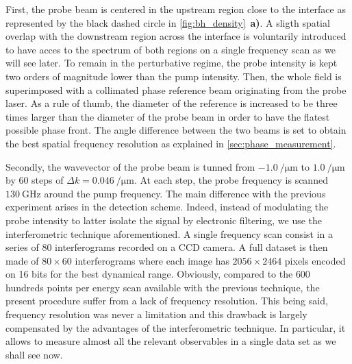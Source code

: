 First, the probe beam is centered in the upstream region close to the interface as represented by the black dashed circle in \autoref{fig:bh_density}~\textbf{a)}.
A sligth spatial overlap with the downstream region across the interface is voluntarily introduced to have acces to the spectrum of both regions on a single frequency scan as we will see later. To remain in 
the perturbative regime, the probe intensity is kept two orders of magnitude lower than the pump intensity.
Then, the whole field is superimposed with a collimated phase reference beam originating from the probe laser. As a rule of thumb, the diameter of the reference is 
increased to be three times larger than the diameter of the probe beam in order to have the flatest possible phase front.
 The angle difference between the two beams is set to obtain the best spatial frequency resolution as explained in \autoref{sec:phase_measurement}.


Secondly, the wavevector of the probe beam is tunned from $\SI{-1.0}{\per \micro \meter}$ to $\SI{1.0}{\per \micro \meter}$ by 60 steps of $\Delta k =\SI{0.046}{\per \micro \meter}$.
At each step, the probe frequency is scanned $\SI{130}{\giga \hertz}$ around the pump frequency. The main difference with the previous experiment arises in the detection scheme. Indeed, instead of modulating 
the probe intensity to latter isolate the signal by electronic filtering, we use the interferometric technique aforementioned. A single frequency scan consist 
in a series of 80 interferograms recorded on a CCD camera. A full dataset is then made of $80\times 60$ interferograms where each image has $2056\times 2464$ pixels encoded on 16 bits
for the best dynamical range. Obviously, compared to the $600$ hundreds points per energy scan available with the previous technique,
the present procedure suffer from a lack of frequency resolution. This being said, frequency resolution was never a limitation and this drawback
is largely compensated by the advantages of the interferometric technique. In particular, it allows to measure almost all the relevant observables in a single data set 
as we shall see now. 

